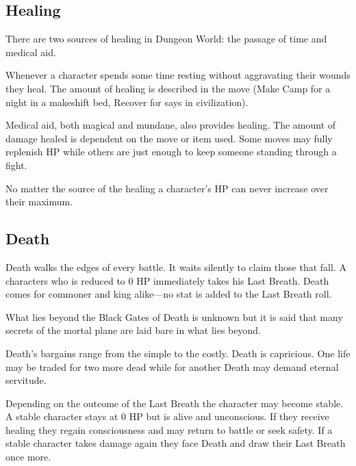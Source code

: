        
\subsection{Healing}  
       

There are two sources of healing in Dungeon World: the passage of time and medical aid.

       

Whenever a character spends some time resting without aggravating their wounds they heal. The amount of healing is described in the move (Make Camp for a night in a makeshift bed, Recover for says in civilization).

       

Medical aid, both magical and mundane, also provides healing. The amount of damage healed is dependent on the move or item used. Some moves may fully replenish HP while others are just enough to keep someone standing through a fight.

       

No matter the source of the healing a character's HP can never increase over their maximum.

       
\subsection{Death}   
       

Death walks the edges of every battle. It waits silently to claim those that fall. A characters who is reduced to 0 HP immediately takes his Last Breath. Death comes for commoner and king alike—no stat is added to the Last Breath roll.

       

What lies beyond the Black Gates of Death is unknown but it is said that many secrets of the mortal plane are laid bare in what lies beyond.

       

Death's bargains range from the simple to the costly. Death is capricious. One life may be traded for two more dead while for another Death may demand eternal servitude.

       

Depending on the outcome of the Last Breath the character may become stable. A stable character stays at 0 HP but is alive and unconscious. If they receive healing they regain consciousness and may return to battle or seek safety. If a stable character takes damage again they face Death and draw their Last Breath once more.

